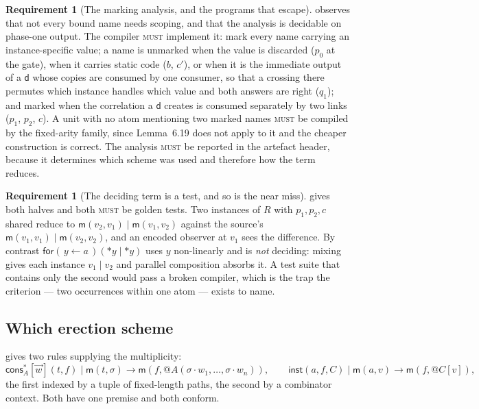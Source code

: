 \documentclass[11pt,a4paper]{article}
\makeatletter
\newcommand{\MUST}{\textsc{must}}
\newcommand{\quo}[1]{@#1}
\newcommand{\drp}[1]{{*}#1}
\newcommand{\inp}[3]{\mathsf{for}(\,#1 \leftarrow #2\,)#3}
\newcommand{\mm}{\mathsf{m}}
\newcommand{\dd}{\mathsf{d}}
\newcommand{\cons}{\mathsf{cons}}
\newcommand{\red}{\longrightarrow}
\newcommand{\inst}{\mathsf{inst}}
\theoremstyle{definition}
\newtheorem{requirement}[definition]{Requirement}
\theoremstyle{plain}
\makeatother
\begin{document}
\begin{requirement}[The marking analysis, and the programs that escape]
\label{req:marking}
\cite[Rem.~6.20]{draft3} observes that not every bound name needs scoping, and
that the analysis is decidable on phase-one output. The compiler \MUST{}
implement it: mark every name carrying an instance-specific value; a name is
unmarked when the value is discarded ($p_{0}$ at the gate), when it carries
static code ($b$, $c'$), or when it is the immediate output of a $\dd$ whose
copies are consumed by one consumer, so that a crossing there permutes which
instance handles which value and both answers are right ($q_{1}$); and marked
when the correlation a $\dd$ creates is consumed separately by two links
($p_{1}$, $p_{2}$, $c$). A unit with no atom mentioning two marked names
\MUST{} be compiled by the fixed-arity family, since
Lemma~6.19 does not apply to it and the cheaper construction is correct. The
analysis \MUST{} be reported in the artefact header, because it determines
which scheme was used and therefore how the term reduces.
\end{requirement}

\begin{requirement}[The deciding term is a test, and so is the near miss]
\label{req:deciding}
\cite[Ex.~6.21]{draft3} gives both halves and both \MUST{} be golden tests.
Two instances of $R$ with $p_{1},p_{2},c$ shared reduce to
$\mm(v_{2},v_{1}) \mid \mm(v_{1},v_{2})$ against the source's
$\mm(v_{1},v_{1}) \mid \mm(v_{2},v_{2})$, and an encoded observer at $v_{1}$
sees the difference. By contrast $\inp{y}{a}{(\drp{y} \mid \drp{y})}$ uses $y$
non-linearly and is \emph{not} deciding: mixing gives each instance
$v_{1} \mid v_{2}$ and parallel composition absorbs it. A test suite that
contains only the second would pass a broken compiler, which is the trap the
criterion --- two occurrences within one atom --- exists to name.
\end{requirement}

\subsection{Which erection scheme}\label{sec:schemes}

\cite[\S6.7]{draft3} gives two rules supplying the multiplicity:
\[
  \cons^{*}_{A}[\vec w](t,f) \mid \mm(t,\sigma) \red
  \mm(f, \quo{A(\sigma\!\cdot\!w_{1},\dots,\sigma\!\cdot\!w_{n})}),
  \qquad
  \inst(a,f,C) \mid \mm(a,v) \red \mm(f,\quo{C[v]}),
\]
\[
\]
the first indexed by a tuple of fixed-length paths, the second by a combinator
context. Both have one premise and both conform.
\end{document}
